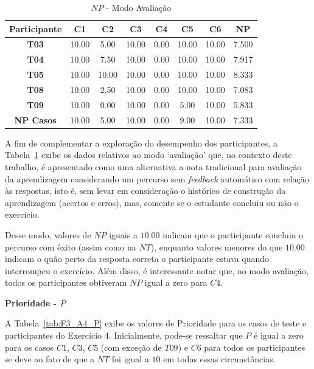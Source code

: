 \begin{table}[htbp]
	\centering
	\caption{$NP$ - Modo Avaliação}
	\begin{tabular}{|c|c|c|c|c|c|c|c|}
		\hline
		\rowcolor[HTML]{D9D9D9} 
		\textbf{Participante} & \textbf{C1} & \textbf{C2} & \textbf{C3} & \textbf{C4} & \textbf{C5} & \textbf{C6} & \textbf{NP} \\ \hline
		\rowcolor[HTML]{FFFFFF} 
		\textbf{T03} & 10.00 & 5.00 & 10.00 & 0.00 & 10.00 & 10.00 & 7.500 \\ \hline
		\rowcolor[HTML]{E7E6E6} 
		\textbf{T04} & 10.00 & 7.50 & 10.00 & 0.00 & 10.00 & 10.00 & 7.917 \\ \hline
		\rowcolor[HTML]{FFFFFF} 
		\textbf{T05} & 10.00 & 10.00 & 10.00 & 0.00 & 10.00 & 10.00 & 8.333 \\ \hline
		\rowcolor[HTML]{E7E6E6} 
		\textbf{T08} & 10.00 & 2.50 & 10.00 & 0.00 & 10.00 & 10.00 & 7.083 \\ \hline
		\rowcolor[HTML]{FFFFFF} 
		\textbf{T09} & 10.00 & 0.00 & 10.00 & 0.00 & 5.00 & 10.00 & 5.833 \\ \hline
		\rowcolor[HTML]{D9D9D9} 
		\textbf{NP Casos} & 10.00 & 5.00 & 10.00 & 0.00 & 9.00 & 10.00 & 7.333 \\ \hline
	\end{tabular}
	\label{tab:F3_A4_NP_AVALIACAO}
\end{table}

A fim de complementar a exploração do desempenho dos participantes, a Tabela~\ref{tab:F3_A4_NP_AVALIACAO} exibe os dados relativos ao modo `avaliação' que, no contexto deste trabalho, é apresentado como uma alternativa a nota tradicional para avaliação da aprendizagem considerando um percurso sem \textit{feedback} automático com relação às respostas, isto é, sem levar em consideração o histórico de construção da aprendizagem (acertos e erros), mas, somente se o estudante concluiu ou não o exercício.

Desse modo, valores de $NP$ iguais a $10.00$ indicam que o participante concluiu o percurso com êxito (assim como na $NT$), enquanto valores menores do que $10.00$ indicam o quão perto da resposta correta o participante estava quando interrompeu o exercício. Além disso, é interessante notar que, no modo avaliação, todos os participantes obtiveram $NP$ igual a zero para $C4$.

\textbf{Prioridade - $P$}

A Tabela~\ref{tab:F3_A4_P} exibe os valores de Prioridade para os casos de teste e participantes do Exercício 4. Inicialmente, pode-se ressaltar que $P$ é igual a zero para os casos $C1$, $C3$, $C5$ (com exceção de $T09$) e $C6$ para todos os participantes se deve ao fato de que a $NT$ foi igual a $10$ em todas essas circunstâncias.

